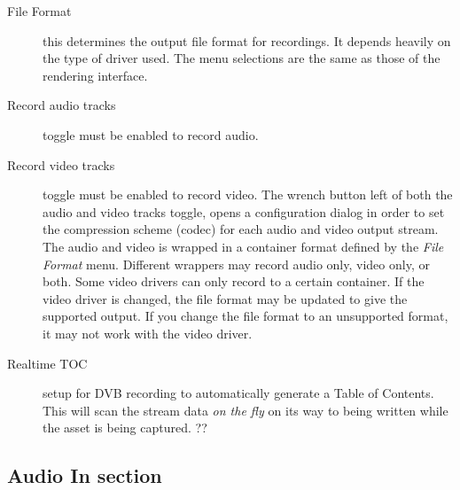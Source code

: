 \begin{description}
    \item[File Format] this determines the output file format for recordings. It depends heavily on the type of driver used. The menu selections are the same as those of the rendering interface.
    \item[Record audio tracks] toggle must be enabled to record audio.
    \item[Record video tracks] toggle must be enabled to record video. The wrench button left of both the audio and video tracks toggle, opens a configuration dialog in order to set the compression scheme (codec) for each audio and video output stream. The audio and video is wrapped in a container format defined by the \textit{File Format} menu. Different wrappers may record audio only, video only, or both.  Some video drivers can only record to a certain container. If the video driver is changed, the file format may be updated to give the supported output. If you change the file format to an unsupported format, it may not work with the video driver.
    \item[Realtime TOC] setup for DVB recording to automatically generate a Table of Contents. This will scan the stream data \textit{on the fly} on its way to being written while the asset is being captured. ??
\end{description}

\subsection{Audio In section}%
\label{sub:audio_in_section}

